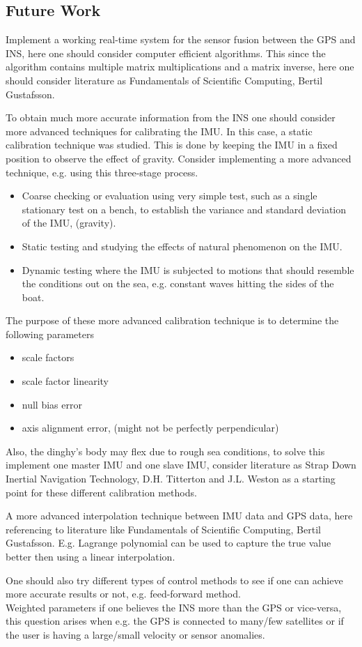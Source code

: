 \subsection{Future Work}
Implement a working real-time system for the sensor fusion between the GPS and INS, here one should consider computer efficient algorithms. This since the algorithm contains multiple matrix multiplications and a matrix inverse, here one should consider literature as Fundamentals of Scientific Computing, Bertil Gustafsson.\newline

To obtain much more accurate information from the INS one should consider more advanced techniques for calibrating the IMU. In this case, a static calibration technique was studied. This is done by keeping the IMU in a fixed position to observe the effect of gravity.
Consider implementing a more advanced technique, e.g. using this three-stage process.
\begin{itemize}
\item Coarse checking or evaluation using very simple test, such as a single stationary test on a bench, to establish the variance and standard deviation of the IMU, (gravity).
\item Static testing and studying the effects of natural phenomenon on the IMU.
\item Dynamic testing where the IMU is subjected to motions that should resemble the conditions out on the sea, e.g. constant waves hitting the sides of the boat. 
\end{itemize}
The purpose of these more advanced calibration technique is to determine the following parameters \cite{non-linear}
\begin{itemize}
\item scale factors
\item scale factor linearity
\item null bias error
\item axis alignment error, (might not be perfectly perpendicular)
\end{itemize}
Also, the dinghy's body may flex due to rough sea conditions, to solve this implement one master IMU and one slave IMU, consider literature as Strap Down Inertial Navigation Technology, D.H. Titterton and J.L. Weston as a starting point for these different calibration methods. \newline 

A more advanced interpolation technique between IMU data and GPS data, here referencing to literature like Fundamentals of Scientific Computing, Bertil Gustafsson. E.g. Lagrange polynomial can be used to capture the true value better then using a linear interpolation.\newline


One should also try different types of control methods to see if one can achieve more accurate results or not, e.g. feed-forward method.\\
Weighted parameters if one believes the INS more than the GPS or vice-versa, this question arises when e.g. the GPS is connected to many/few satellites or if the user is having a large/small velocity or sensor anomalies. \\ \\
